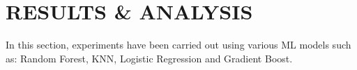 \documentclass{llncs}
\begin{document}








\section{RESULTS \& ANALYSIS}
In this section, experiments have been carried out using various ML models such as: Random Forest, KNN, Logistic Regression and Gradient Boost. 
\end{document}
